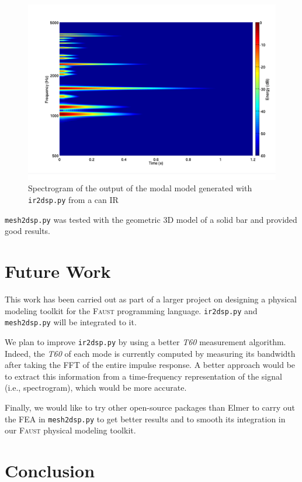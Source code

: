 \documentclass[11pt,a4paper]{article}
\newcommand{\f}{\textsc{Faust}}
\begin{document}
\begin{figure}[htbp]
  \centering
  \includegraphics[width=\columnwidth]{pictures/canModalModel}
  \caption{Spectrogram of the output of the modal model generated with \texttt{ir2dsp.py} from a can IR}
  \label{fig:spectro2}
\end{figure}

\texttt{mesh2dsp.py} was tested with the geometric 3D model of a solid bar and provided good results. 

\section{Future Work}
\label{sec:future}

This work has been carried out as part of a larger project on designing a physical modeling toolkit for the \f{} programming language. \texttt{ir2dsp.py} and \texttt{mesh2dsp.py} will be integrated to it.

We plan to improve \texttt{ir2dsp.py} by using a better \textit{T60} measurement algorithm. Indeed, the \textit{T60} of each mode is currently computed by measuring its bandwidth after taking the FFT of the entire impulse response. A better approach would be to extract this information from a time-frequency representation of the signal (i.e., spectrogram), which would be more accurate.

Finally, we would like to try other open-source packages than Elmer to carry out the FEA in \texttt{mesh2dsp.py} to get better results and to smooth its integration in our \f{} physical modeling toolkit.  

\section{Conclusion}
\end{document}
